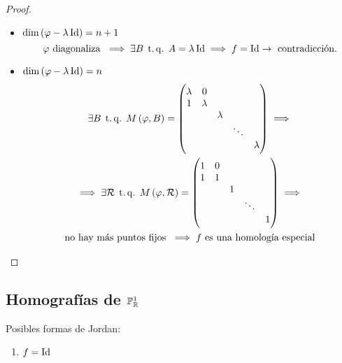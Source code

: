 \begin{proof}
\begin{itemize}
\begin{itemize}
            \item{$\dim \left( \varphi - \lambda \operatorname{Id} \right) = n+1$}
                \[
                    \varphi \text{ diagonaliza } \implies \exists B \operatorname{\;t.q.\;} A=\lambda \operatorname{Id} \implies f= \operatorname{Id} \to \text{ contradicción}.
                \]
            \item{$\dim \left( \varphi - \lambda \operatorname{Id} \right) = n$}
                \begin{gather*}
                    \exists B \operatorname{\;t.q.\;} M \left( \varphi, B \right) =
                    \begin{pmatrix}
                        \lambda & 0 &  &  &  \\
                        1 & \lambda &  &  &  \\
                         &  & \lambda &  &  \\
                         &  &  & \ddots &  \\
                         &  &  &  & \lambda
                    \end{pmatrix} \implies \\
                    \implies \exists \mathcal{R} \operatorname{\;t.q.\;} M \left( \varphi, \mathcal{R} \right) =
                    \begin{pmatrix}
                        1 & 0 &  &  &  \\
                        1 & 1 &  &  &  \\
                         &  & 1 &  &  \\
                         &  &  & \ddots &  \\
                         &  &  &  & 1
                    \end{pmatrix} \implies \\
                    \text{no hay más puntos fijos } \implies f \text{ es una homología especial}
                \end{gather*}
        \end{itemize}
    \end{itemize}
\end{proof}

\subsection{Homografías de $\mathbb{P}_{\mathbb{R}}^1$}
Posibles formas de Jordan:
\begin{enumerate}
    \item $f=\operatorname{Id}$
\end{enumerate}


